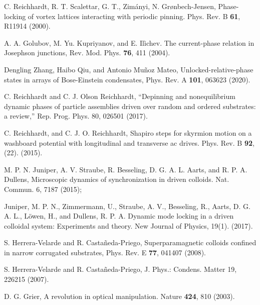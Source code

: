 \documentclass[twocolumn,preprintnumbers,amsmath,amssymb,aps,prx]{revtex4}
\begin{document}
\begin{thebibliography}{99}
 C. Reichhardt, R. T. Scalettar, G. T., Zim{\'a}nyi, N. Gr{\o}nbech-Jensen,  Phase-locking of vortex lattices interacting with periodic pinning.  Phys. Rev. B {\bf 61}, R11914 (2000).
  
     A. A. Golubov, M. Yu. Kupriyanov, and E. Il{\`i}chev. The current-phase relation in Josephson junctions, Rev. Mod. Phys. {\bf 76}, 411 (2004).

      
     Dengling Zhang, Haibo Qiu, and Antonio Mu{\~n}oz Mateo, Unlocked-relative-phase states in arrays of Bose-Einstein condensates, Phys. Rev. A {\bf 101}, 063623 (2020).

     C. Reichhardt and C. J. Olson Reichhardt, “Depinning and nonequilibrium dynamic phases of particle assemblies driven over random and ordered substrates: a review,” Rep. Prog. Phys. 80, 026501 (2017).

     C. Reichhardt, and C. J. O. Reichhardt,  Shapiro steps for skyrmion motion on a washboard potential with longitudinal and transverse ac drives. Phys. Rev. B {\bf 92}, (22). (2015).
      
     M. P. N. Juniper, A. V. Straube, R. Besseling, D. G. A. L. Aarts, and R. P. A. Dullens, Microscopic dynamics of synchronization in driven colloids. Nat. Commun. 6, 7187 (2015); 
      
       Juniper, M. P. N., Zimmermann, U., Straube, A. V., Besseling, R., Aarts, D. G. A. L., L{\"o}wen, H., and Dullens, R. P. A.  Dynamic mode locking in a driven colloidal system: Experiments and theory. New Journal of Physics, 19(1). (2017).  %
      
     S. Herrera-Velarde and R. Casta{\~n}eda-Priego, Superparamagnetic colloids confined in narrow corrugated substrates, Phys. Rev. E {\bf 77}, 041407 (2008).

     S. Herrera-Velarde and R. Casta{\~n}eda-Priego, J. Phys.: Condens. Matter 19, 226215 (2007).

     D. G. Grier, A revolution in optical manipulation. Nature {\bf 424}, 810 (2003).


\end{thebibliography}
\end{document}
